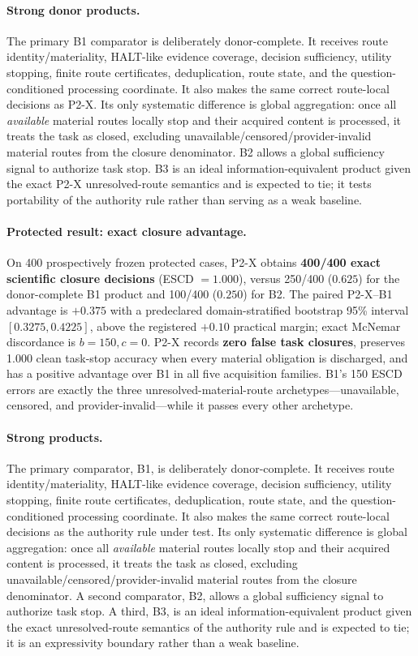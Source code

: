 \paragraph{Strong donor products.}
The primary B1 comparator is deliberately donor-complete. It receives route identity/materiality, HALT-like evidence coverage, decision sufficiency, utility stopping, finite route certificates, deduplication, route state, and the question-conditioned processing coordinate. It also makes the same correct route-local decisions as P2-X. Its only systematic difference is global aggregation: once all \emph{available} material routes locally stop and their acquired content is processed, it treats the task as closed, excluding unavailable/censored/provider-invalid material routes from the closure denominator. B2 allows a global sufficiency signal to authorize task stop. B3 is an ideal information-equivalent product given the exact P2-X unresolved-route semantics and is expected to tie; it tests portability of the authority rule rather than serving as a weak baseline.

\paragraph{Protected result: exact closure advantage.}
On 400 prospectively frozen protected cases, P2-X obtains \textbf{400/400 exact scientific closure decisions} (ESCD $=1.000$), versus 250/400 ($0.625$) for the donor-complete B1 product and 100/400 ($0.250$) for B2. The paired P2-X--B1 advantage is \textbf{$+0.375$} with a predeclared domain-stratified bootstrap 95\% interval $[0.3275,0.4225]$, above the registered $+0.10$ practical margin; exact McNemar discordance is $b=150,c=0$. P2-X records \textbf{zero false task closures}, preserves 1.000 clean task-stop accuracy when every material obligation is discharged, and has a positive advantage over B1 in all five acquisition families. B1's 150 ESCD errors are exactly the three unresolved-material-route archetypes---unavailable, censored, and provider-invalid---while it passes every other archetype.
\paragraph{Strong products.}
The primary comparator, B1, is deliberately donor-complete. It receives route identity/materiality, HALT-like evidence coverage, decision sufficiency, utility stopping, finite route certificates, deduplication, route state, and the question-conditioned processing coordinate. It also makes the same correct route-local decisions as the authority rule under test. Its only systematic difference is global aggregation: once all \emph{available} material routes locally stop and their acquired content is processed, it treats the task as closed, excluding unavailable/censored/provider-invalid material routes from the closure denominator. A second comparator, B2, allows a global sufficiency signal to authorize task stop. A third, B3, is an ideal information-equivalent product given the exact unresolved-route semantics of the authority rule and is expected to tie; it is an expressivity boundary rather than a weak baseline.

